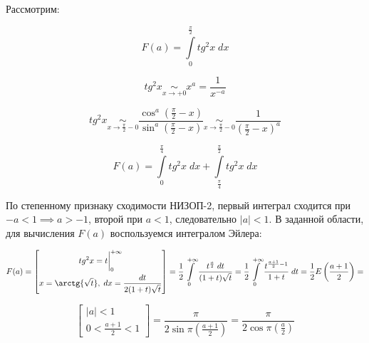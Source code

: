 \documentclass[../../main.tex]{subfiles}
\begin{document}
\begin{example}
	Рассмотрим:
	
	\[  F(a) = \int\limits_{0}^{\frac{\pi}{2}} tg^2 x \; dx      \]
	
	\[ tg^2 x  {\underset{x \to +0}\sim} x^a = \frac{1}{x^{-a}}\]
		
	\[ tg^2 x {\underset{x \to \frac{\pi}{2} - 0}\sim} \frac{\cos^a \left( 
	\frac{\pi}{2} - x\right) }{\sin^a \left( \frac{\pi}{2} - x\right)} 
	{\underset{x \to \frac{\pi}{2} - 0}\sim} \frac{1}{\left( \frac{\pi}{2} - 
	x\right)^a } \]
	
	\[  F(a) = \int\limits_{0}^{\frac{\pi}{4}} tg^2 x \; dx + 
	\int\limits_{\frac{\pi}{4}}^{\frac{\pi}{2}} tg^2 x \; dx     \]
	
	По степенному признаку сходимости НИЗОП-2, первый интеграл сходится при $-a < 
	1 \implies a > -1$, второй при $a < 1$, следовательно $|a| < 1$. В заданной 
	области, для вычисления $F(a)$ воспользуемся интегралом Эйлера:
	
	\[  F(a) = \left[ \begin{gathered}   
	tg^2 x  = t \bigg|_{0}^{+\infty}\\
	x = \arctg{\sqrt{t}}, \; dx = \frac{dt}{2(1+t)\sqrt{t}}
	\end{gathered}\right] = \frac{1}{2} \int\limits_{0}^{+\infty} \frac{ 
	t^{\frac{a}{2}}  \; dt}{(1+t)\sqrt{t}} = \frac{1}{2} 
	\int\limits_{0}^{+\infty} \frac{t^{\frac{a+1}{2} - 1} }{1+t} \; dt = 
	\frac{1}{2}E\left( \frac{a+1}{2} \right) =        \]
	
	\[  \left[ \begin{gathered}   
	|a|<1\\
	0 < \frac{a+1}{2} < 1
	\end{gathered}\right] = \frac{\pi}{2\sin{\pi\left( \frac{a+1}{2}\right) }} =  
	\frac{\pi}{2\cos{\pi\left( \frac{a}{2}\right) }}       \]
	
\end{example}	
\end{document}
